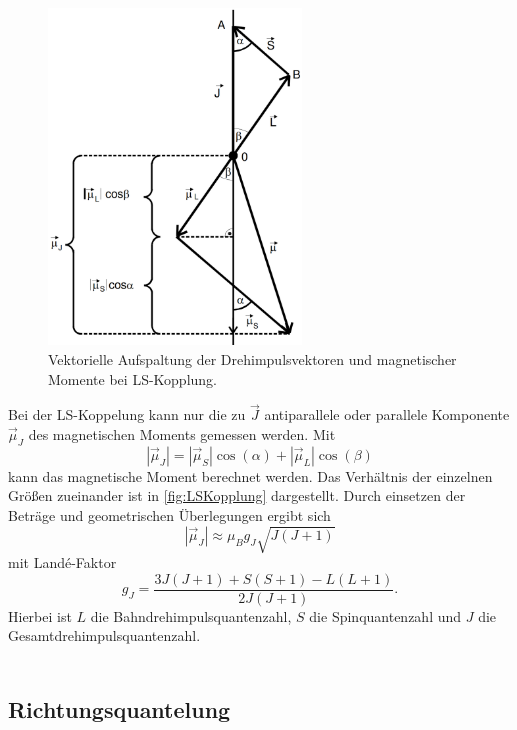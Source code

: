 \begin{figure}[H]
    \centering
    \includegraphics[width=0.6\textwidth]{img/LSKopplung.png}
    \caption{Vektorielle Aufspaltung der Drehimpulsvektoren und magnetischer Momente bei LS-Kopplung. \cite{V606}}
    \label{fig:LSKopplung}
\end{figure}

Bei der LS-Koppelung kann nur die zu $\vec{J}$ antiparallele oder parallele Komponente $\vec{μ}_J$ des magnetischen Moments gemessen werden.
Mit
\begin{equation*}
    |\vec{μ}_J| = |\vec{μ}_S| \cos(α) + |\vec{μ}_L| \cos(β)
\end{equation*}
kann das magnetische Moment berechnet werden.
Das Verhältnis der einzelnen Größen zueinander ist in \autoref{fig:LSKopplung} dargestellt.
Durch einsetzen der Beträge und geometrischen Überlegungen ergibt sich
\begin{equation*}
    |\vec{μ}_J| \approx μ_B g_J \sqrt{J(J+1)}
\end{equation*}
mit Landé-Faktor
\begin{equation*}
    g_J = \frac{3J(J+1) + S(S+1) - L(L+1)}{2J(J+1)}.
\end{equation*}
Hierbei ist $L$ die Bahndrehimpulsquantenzahl, $S$ die Spinquantenzahl und $J$ die Gesamtdrehimpulsquantenzahl.
\\
\\
\subsection{Richtungsquantelung}

